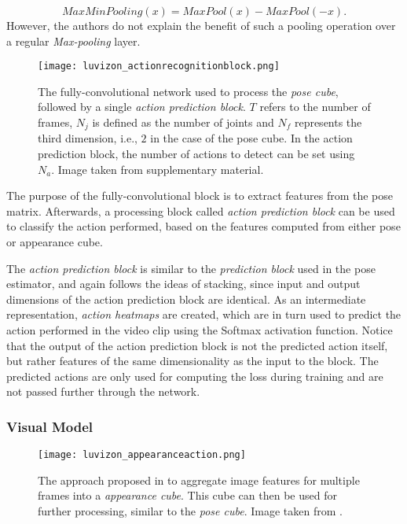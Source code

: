 \begin{equation}
    MaxMinPooling(x) = MaxPool(x) - MaxPool(-x).
\end{equation}
However, the authors do not explain the benefit of such a pooling operation over a regular \textit{Max-pooling} layer.

\begin{figure}[htb!]
    \centering
    \texttt{[image: luvizon\_actionrecognitionblock.png]}
    \caption{The fully-convolutional network used to process the \textit{pose cube}, followed by a single \textit{action prediction block}. $T$ refers to the number of frames, $N_j$ is defined as the number of joints and $N_f$ represents the third dimension, i.e., $2$ in the case of the pose cube. In the action prediction block, the number of actions to detect can be set using $N_a$. Image taken from \cite{luvizon_2d/3d_2018} supplementary material.}
    \label{fig:luvizon_actionrecognitionblock}
\end{figure}

The purpose of the fully-convolutional block is to extract features from the pose matrix.
Afterwards, a processing block called \textit{action prediction block} can be used to classify the action performed, based on the features computed from either pose or appearance cube. 

The \textit{action prediction block} is similar to the \textit{prediction block} used in the pose estimator, and again follows the ideas of stacking, since input and output dimensions of the action prediction block are identical.
As an intermediate representation, \textit{action heatmaps} are created, which are in turn used to predict the action performed in the video clip using the Softmax activation function.
Notice that the output of the action prediction block is not the predicted action itself, but rather features of the same dimensionality as the input to the block.
The predicted actions are only used for computing the loss during training and are not passed further through the network.

\subsubsection{Visual Model}
\begin{figure}[htb!]
    \centering
    \texttt{[image: luvizon\_appearanceaction.png]}
    \caption{The approach proposed in \cite{luvizon_2d/3d_2018} to aggregate image features for multiple frames into a \textit{appearance cube}. This cube can then be used for further processing, similar to the \textit{pose cube}. Image taken from \cite{luvizon_2d/3d_2018}.}
    \label{fig:luvizon_appearanceaction}
\end{figure}

